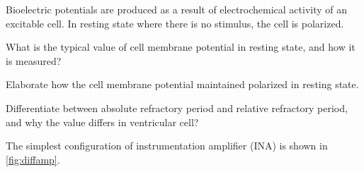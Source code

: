 \documentclass[12pt]{article}
\begin{document}
\clearpage		%
\question{}

\listbeginx	%
	\item Bioelectric potentials are produced as a result of electrochemical activity of an excitable cell. In resting state where there is no stimulus, the cell is polarized.
	
	
	\listbegin
		\item What is the typical value of cell membrane potential in resting state, and how it is measured?
		
		
		
		\item Elaborate how the cell membrane potential maintained polarized in resting state.
		
		
		
		\item Differentiate between absolute refractory period and relative refractory period, and why the value differs in ventricular cell?
		
		
	\listclose 
	
	
	\item The simplest configuration of instrumentation amplifier (INA) is shown in \cref{fig:diffamp}. 
	
	
\end{document}
